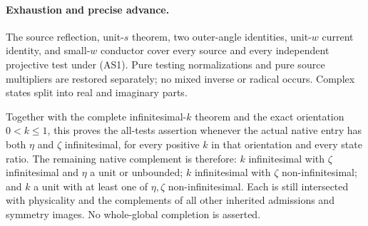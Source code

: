 \paragraph{Exhaustion and precise advance.}
The source reflection, unit-$s$ theorem, two outer-angle identities,
unit-$w$ current identity, and small-$w$ conductor cover every source
and every independent projective test under (AS1). Pure testing
normalizations and pure source multipliers are restored separately;
no mixed inverse or radical occurs. Complex states split into real
and imaginary parts.

Together with the complete infinitesimal-$k$ theorem and the exact
orientation $0<k\le1$, this proves the all-tests assertion whenever
the actual native entry has both $\eta$ and $\zeta$ infinitesimal,
for every positive $k$ in that orientation and every state ratio.
The remaining native complement is therefore: $k$ infinitesimal with
$\zeta$ infinitesimal and $\eta$ a unit or unbounded; $k$
infinitesimal with $\zeta$ non-infinitesimal; and $k$ a unit with
at least one of $\eta,\zeta$ non-infinitesimal. Each is still
intersected with physicality and the complements of all other inherited
admissions and symmetry images. No whole-global completion is asserted.

